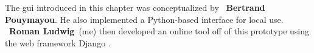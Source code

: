\begin{tcolorbox}[title=\faIcon{users} Contributions, parbox=false]
    The \acrlong{gui} introduced in this chapter was conceptualized by ~\textbf{Bertrand Pouymayou}. He also implemented a Python-based interface for local use. ~\textbf{Roman Ludwig}~(me) then developed an online tool off of this prototype using the web framework Django \cite{noauthor_django_2022}.
\end{tcolorbox}
